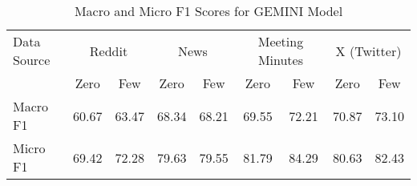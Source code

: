 \begin{table}[htbp]
\centering
\begin{tabular}{l *{8}{c}}
\toprule
Data Source & \multicolumn{2}{c}{Reddit} & \multicolumn{2}{c}{News} & \multicolumn{2}{c}{Meeting Minutes} & \multicolumn{2}{c}{X (Twitter)} \\
& Zero & Few & Zero & Few & Zero & Few & Zero & Few \\
\midrule
Macro F1 & 60.67 & 63.47 & 68.34 & 68.21 & 69.55 & 72.21 & 70.87 & 73.10 \\
Micro F1 & 69.42 & 72.28 & 79.63 & 79.55 & 81.79 & 84.29 & 80.63 & 82.43 \\
\bottomrule
\end{tabular}
\centering\caption{Macro and Micro F1 Scores for GEMINI Model}
\label{tab:gemini_macro_micro}
\end{table}
